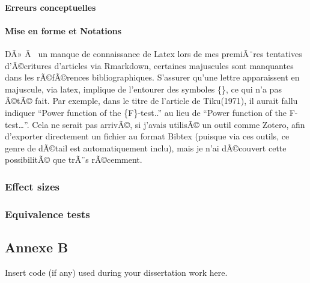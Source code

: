\begin{appendix}
\hypertarget{erreurs-conceptuelles-1}{%
\paragraph{Erreurs conceptuelles}\label{erreurs-conceptuelles-1}}

\hypertarget{mise-en-forme-et-notations-1}{%
\paragraph{Mise en forme et
Notations}\label{mise-en-forme-et-notations-1}}

DÃ» Ã~ un manque de connaissance de Latex lors de mes premiÃ¨res
tentatives d'Ã©critures d'articles via Rmarkdown, certaines majuscules
sont manquantes dans les rÃ©fÃ©rences bibliographiques. S'assurer qu'une
lettre apparaissent en majuscule, via latex, implique de l'entourer des
symboles \{\}, ce qui n'a pas Ã©tÃ© fait. Par exemple, dans le titre de
l'article de Tiku(1971), il aurait fallu indiquer ``Power function of
the \{F\}-test..'' au lieu de ``Power function of the F-test\ldots{}''.
Cela ne serait pas arrivÃ©, si j'avais utilisÃ© un outil comme Zotero,
afin d'exporter directement un fichier au format Bibtex (puisque via ces
outils, ce genre de dÃ©tail est automatiquement inclu), mais je n'ai
dÃ©couvert cette possibilitÃ© que trÃ¨s rÃ©cemment.

\hypertarget{effect-sizes}{%
\subsubsection{Effect sizes}\label{effect-sizes}}

\hypertarget{equivalence-tests}{%
\subsubsection{Equivalence tests}\label{equivalence-tests}}

\newpage

\hypertarget{annexe-b}{%
\subsection{Annexe B}\label{annexe-b}}

Insert code (if any) used during your dissertation work here.
\end{appendix}
